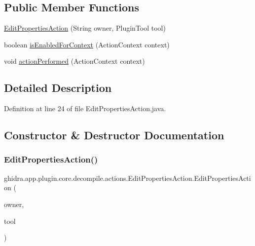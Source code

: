 \subsection*{Public Member Functions}
\begin{DoxyCompactItemize}
\item 
\mbox{\hyperlink{classghidra_1_1app_1_1plugin_1_1core_1_1decompile_1_1actions_1_1_edit_properties_action_abd2049a1d8781a36f4470398a59290ac}{Edit\+Properties\+Action}} (String owner, Plugin\+Tool tool)
\item 
boolean \mbox{\hyperlink{classghidra_1_1app_1_1plugin_1_1core_1_1decompile_1_1actions_1_1_edit_properties_action_a8748e5c443f57d52640aae419531a972}{is\+Enabled\+For\+Context}} (Action\+Context context)
\item 
void \mbox{\hyperlink{classghidra_1_1app_1_1plugin_1_1core_1_1decompile_1_1actions_1_1_edit_properties_action_ab0d3e941961949e51d9b52cd0872561a}{action\+Performed}} (Action\+Context context)
\end{DoxyCompactItemize}


\subsection{Detailed Description}


Definition at line 24 of file Edit\+Properties\+Action.\+java.



\subsection{Constructor \& Destructor Documentation}
\mbox{\label{classghidra_1_1app_1_1plugin_1_1core_1_1decompile_1_1actions_1_1_edit_properties_action_abd2049a1d8781a36f4470398a59290ac}} 
\subsubsection{\texorpdfstring{EditPropertiesAction()}{EditPropertiesAction()}}
{\footnotesize\ttfamily ghidra.\+app.\+plugin.\+core.\+decompile.\+actions.\+Edit\+Properties\+Action.\+Edit\+Properties\+Action (\begin{DoxyParamCaption}\item[{String}]{owner,  }\item[{Plugin\+Tool}]{tool }\end{DoxyParamCaption})\hspace{0.3cm}{\ttfamily [inline]}}



